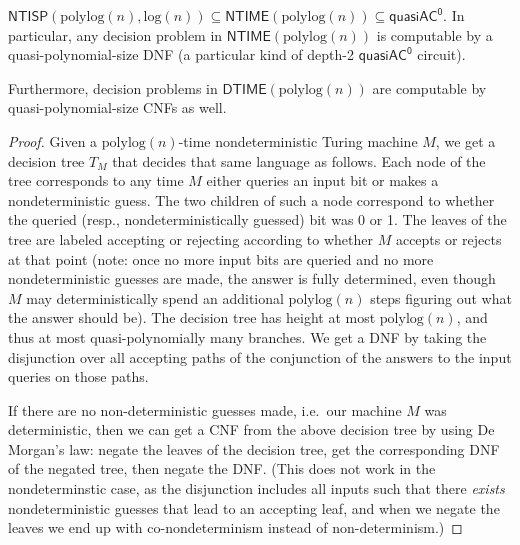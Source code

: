 \documentclass{article}
\newcommand*{\ComplexityClass}[1]{\ensuremath{\mathsf{#1}}\xspace}
\newcommand{\NTISP}{\ComplexityClass{NTISP}}
\newcommand{\NTISPpll}{\ensuremath{\NTISP(\mathrm{polylog}(n),\mathrm{log}(n))}\xspace}
\newcommand{\qACz}{\ComplexityClass{quasiAC^0}}
\newcommand{\DTIME}{\ComplexityClass{DTIME}}
\newcommand{\NTIME}{\ComplexityClass{NTIME}}
\begin{document}
\begin{fact}\label{fact:NTISP} 
$\NTISPpll \subseteq \NTIME(\mathrm{polylog} (n)) \subseteq \qACz$. In particular, any decision problem in $\NTIME(\mathrm{polylog} (n))$ is computable by 
a quasi-polynomial-size DNF (a particular kind of depth-2 $\qACz$ circuit).

Furthermore, decision problems in $\DTIME(\mathrm{polylog} (n))$ are computable by quasi-polynomial-size CNFs as well.
\end{fact}

\begin{proof}
Given a $\mathrm{polylog} (n)$-time nondeterministic Turing machine $M$, we get a decision tree $T_M$ that decides that same language as follows. Each node of the tree corresponds to any time $M$ either queries an input bit or makes a nondeterministic guess. The two children of such a node correspond to whether the queried (resp., nondeterministically guessed) bit was 0 or 1. The leaves of the tree are labeled accepting or rejecting according to whether $M$ accepts or rejects at that point (note: once no more input bits are queried and no more nondeterministic guesses are made, the answer is fully determined, even though $M$ may deterministically spend an additional $\mathrm{polylog} (n)$ steps figuring out what the answer should be). The decision tree has height at most $\mathrm{polylog} (n)$, and thus at most quasi-polynomially many branches. We get a DNF by taking the disjunction over all accepting paths of the conjunction of the answers to the input queries on those paths.

If there are no non-deterministic guesses made, i.e.\ our machine $M$ was deterministic, then we can get a CNF from the above decision tree by using De Morgan's law: negate the leaves of the decision tree, get the corresponding DNF of the negated tree, then negate the DNF. (This does not work in the nondeterminstic case, as the disjunction includes all inputs such that there \emph{exists} nondeterministic guesses that lead to an accepting leaf, and when we negate the leaves we end up with co-nondeterminism instead of non-determinism.)
\end{proof}
\end{document}
